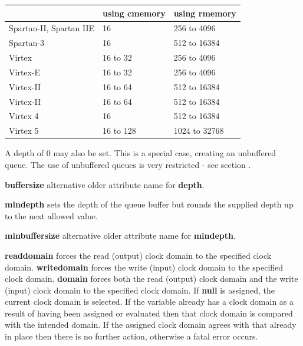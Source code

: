         \begin{tabular}{| l | l | l |} \hline
                                & using cmemory  & using rmemory \\ \hline \hline
        Spartan-II, Spartan IIE & 16             &  256 to  4096 \\ \hline
        Spartan-3               & 16             &  512 to 16384 \\ \hline
        Virtex                  & 16 to  32      &  256 to  4096 \\ \hline
        Virtex-E                & 16 to  32      &  256 to  4096 \\ \hline
        Virtex-II               & 16 to  64      &  512 to 16384 \\ \hline
        Virtex-II               & 16 to  64      &  512 to 16384 \\ \hline
        Virtex 4                & 16             &  512 to 16384 \\ \hline
        Virtex 5                & 16 to 128      & 1024 to 32768 \\ \hline                                        
        \end{tabular}
        
        A depth of 0 may also be set. This is a special case, creating an
        unbuffered queue. The use of unbuffered queues is very restricted -
        see section .

        {\bf buffersize} alternative older attribute name for {\bf depth}.

        {\bf mindepth} sets the depth of the queue buffer but rounds the
        supplied depth up to the next allowed value.

        {\bf minbuffersize} alternative older attribute name for {\bf mindepth}.

        {\bf readdomain} forces the read (output) clock domain to the specified
        clock domain. {\bf writedomain} forces the write (input) clock domain to
        the specified clock domain.
        {\bf domain} forces both the read (output) clock domain and the write
        (input) clock domain to the specified clock domain. 
        If {\bf null} is assigned, the current clock domain
        is selected. If the variable already has a clock domain as a result of
        having been assigned or evaluated then that clock domain is compared with
        the intended domain. If the assigned clock domain agrees with that already
        in place then there is no further action, otherwise a fatal error occurs.
        
